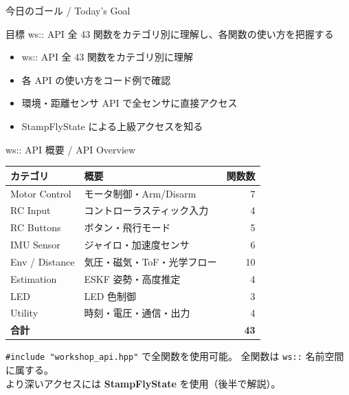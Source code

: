 \documentclass[aspectratio=169, 14pt]{beamer}
\begin{document}
\begin{frame}
  \titlepage
\end{frame}

\begin{frame}{今日のゴール / Today's Goal}
  \begin{block}{目標}
    ws:: API 全 43 関数をカテゴリ別に理解し、各関数の使い方を把握する
  \end{block}

  \vspace{0.5em}

  \begin{itemize}
    \item ws:: API 全 43 関数をカテゴリ別に理解
    \item 各 API の使い方をコード例で確認
    \item 環境・距離センサ API で全センサに直接アクセス
    \item StampFlyState による上級アクセスを知る
  \end{itemize}
\end{frame}


\begin{frame}{ws:: API 概要 / API Overview}
  \centering
  {\small
  \begin{tabular}{llr}
    \hline
    \textbf{カテゴリ} & \textbf{概要} & \textbf{関数数} \\
    \hline
    Motor Control   & モータ制御・Arm/Disarm    & 7 \\
    RC Input        & コントローラスティック入力 & 4 \\
    RC Buttons      & ボタン・飛行モード         & 5 \\
    IMU Sensor      & ジャイロ・加速度センサ     & 6 \\
    Env / Distance  & 気圧・磁気・ToF・光学フロー & 10 \\
    Estimation      & ESKF 姿勢・高度推定        & 4 \\
    LED             & LED 色制御                 & 3 \\
    Utility         & 時刻・電圧・通信・出力     & 4 \\
    \hline
    \multicolumn{2}{l}{\textbf{合計}} & \textbf{43} \\
    \hline
  \end{tabular}
  }

  \vspace{0.5em}
  {\footnotesize
    \texttt{\#include "workshop\_api.hpp"} で全関数を使用可能。
    全関数は \texttt{ws::} 名前空間に属する。\\
    より深いアクセスには \textbf{StampFlyState} を使用（後半で解説）。
  }
\end{frame}
\end{document}
